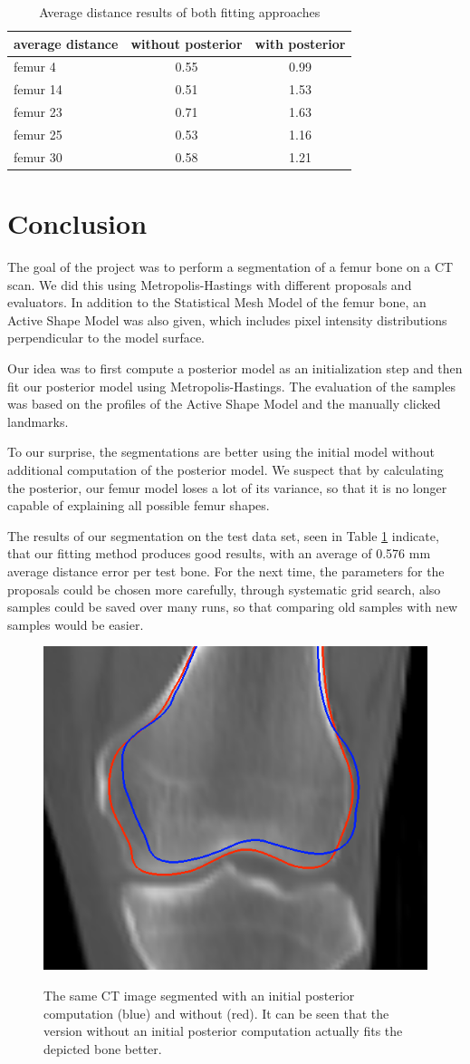 \documentclass{IEEEtran}
\begin{document}
\begin{table}[h]
\centering
\begin{tabular}{l|c|c}
average distance & without posterior & with posterior\\
\hline
femur 4 & 0.55 & 0.99 \\
femur 14 & 0.51 & 1.53 \\
femur 23 & 0.71 & 1.63 \\
femur 25 & 0.53 & 1.16 \\
femur 30 & 0.58 & 1.21\\
\end{tabular}
\caption{Average distance results of both fitting approaches}
\label{avgdistances}
\end{table}

\newpage

\section{Conclusion}
The goal of the project was to perform a segmentation of a femur bone on a CT scan. We did this using Metropolis-Hastings with different proposals and evaluators. In addition to the Statistical Mesh Model of the femur bone, an Active Shape Model was also given, which includes pixel intensity distributions perpendicular to the model surface.\par
Our idea was to first compute a posterior model as an initialization step and then fit our posterior model using Metropolis-Hastings. The evaluation of the samples was based on the profiles of the Active Shape Model and the manually clicked landmarks.\par
To our surprise, the segmentations are better using the initial model without additional computation of the posterior model. We suspect that by calculating the posterior, our femur model loses a lot of its variance, so that it is no longer capable of explaining all possible femur shapes.\par
The results of our segmentation on the test data set, seen in Table \ref{avgdistances} indicate, that our fitting method produces good results, with an average of 0.576 mm average distance error per test bone. For the next time, the parameters for the proposals could be chosen more carefully, through systematic grid search, also samples could be saved over many runs, so that comparing old samples with new samples would be easier.

\begin{figure}[h]
	\centering
	\includegraphics[width=.3\textwidth]{img/conclusion_image.png}
	\label{fig:conclusion_image}
	\caption{The same CT image segmented with an initial posterior computation (blue) and without (red). It can be seen that the version without an initial posterior computation actually fits the depicted bone better.}
	\label{comparison}
\end{figure}
\end{document}

